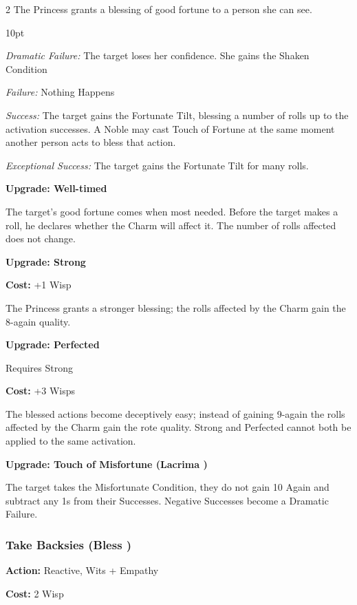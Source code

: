 \begin{multicols}{2}
\noindent The Princess grants a blessing of good fortune to a person she can see.

\begin{myindentpar}{10pt}

\emph{Dramatic Failure:} The target loses her confidence. She gains the Shaken Condition

\emph{Failure:} Nothing Happens 

\emph{Success:}  The target gains the Fortunate Tilt, blessing a number of rolls up to the activation successes. A Noble may cast Touch of Fortune at the same moment another person acts to bless that action.

\emph{Exceptional Success:} The target gains the Fortunate Tilt for many rolls.

\textbf{Upgrade: Well-timed}

The target's good fortune comes when most needed. Before the target makes a roll, he declares whether the Charm will affect it. The number of rolls affected does not change. 

\textbf{Upgrade: Strong}

\noindent \textbf{Cost:} +1 Wisp

The Princess grants a stronger blessing; the rolls affected by the Charm gain the 8-again quality.

\textbf{Upgrade: Perfected}

Requires Strong

\noindent \textbf{Cost:} +3 Wisps

The blessed actions become deceptively easy; instead of gaining 9-again the rolls affected by the Charm gain the rote quality. Strong and Perfected cannot both be applied to the same activation.

\textbf{Upgrade: Touch of Misfortune (Lacrima \textbullet\textbullet)}

The target takes the Misfortunate Condition, they do not gain 10 Again and subtract any 1s from their Successes. Negative Successes become a Dramatic Failure. 

\end{myindentpar}

\subsubsection*{Take Backsies (Bless \textbullet\textbullet)}

\noindent \textbf{Action:} Reactive, Wits + Empathy

\noindent \textbf{Cost:} 2 Wisp


\end{multicols}
